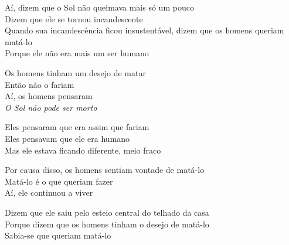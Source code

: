 \noindent Aí, dizem que o Sol não queimava mais só um pouco\\
Dizem que ele se tornou incandescente\\
Quando sua incandescência ficou insustentável, dizem que os homens
queriam matá-lo\\
Porque ele não era mais um ser humano

\smallskip
\begin{center}\end{center}
\smallskip

\noindent Os homens tinham um desejo de matar\\
Então não o fariam\\
Aí, os homens pensaram\\
\textit{O Sol não pode ser morto}

\smallskip
\begin{center}\end{center}
\smallskip

\noindent Eles pensaram que era assim que fariam\\
Eles pensavam que ele era humano\\
Mas ele estava ficando diferente, meio fraco

\smallskip
\begin{center}\end{center}
\smallskip

\noindent Por causa disso, os homens sentiam vontade de matá-lo\\
Matá-lo é o que queriam fazer\\
Aí, ele continuou a viver

\smallskip
\begin{center}\end{center}
\smallskip

\noindent Dizem que ele saiu pelo esteio central do telhado da casa\\
Porque dizem que os homens tinham o desejo de matá-lo\\
Sabia-se que queriam matá-lo

